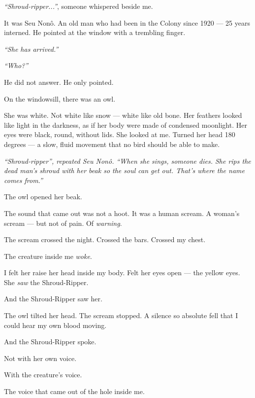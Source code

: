 \noindent \textit{\textquotedblleft{}Shroud-ripper...\textquotedblright{}}, someone whispered beside me.

\noindent It was Seu Nonô. An old man who had been in the Colony since 1920 --- 25 years interned. He pointed at the window with a trembling finger.

\noindent \textit{\textquotedblleft{}She has arrived.\textquotedblright{}}

\noindent \textit{\textquotedblleft{}Who?\textquotedblright{}}

\noindent He did not answer. He only pointed.

\noindent On the windowsill, there was an owl.

\noindent She was white. Not white like snow --- white like old bone. Her feathers looked like light in the darkness, as if her body were made of condensed moonlight. Her eyes were black, round, without lids. She looked at me. Turned her head 180 degrees --- a slow, fluid movement that no bird should be able to make.

\noindent \textit{\textquotedblleft{}Shroud-ripper\textquotedblright{}\textit{, repeated Seu Nonô. }\textquotedblleft{}When she sings, someone dies. She rips the dead man's shroud with her beak so the soul can get out. That's where the name comes from.\textquotedblright{}}

\noindent The owl opened her beak.

\noindent The sound that came out was not a hoot.
It was a human scream.
A woman's scream --- but not of pain.
Of \textit{warning}.

\noindent The scream crossed the night. Crossed the bars. Crossed my chest.

\noindent The creature inside me \textit{woke}.

\noindent I felt her raise her head inside my body. Felt her eyes open --- the yellow eyes. She \textit{saw} the Shroud-Ripper.

\noindent And the Shroud-Ripper saw her.

\noindent The owl tilted her head. The scream stopped. A silence so absolute fell that I could hear my own blood moving.

\noindent And the Shroud-Ripper spoke.

\noindent Not with her own voice.

\noindent With the creature's voice.

\noindent The voice that came out of the hole inside me.

